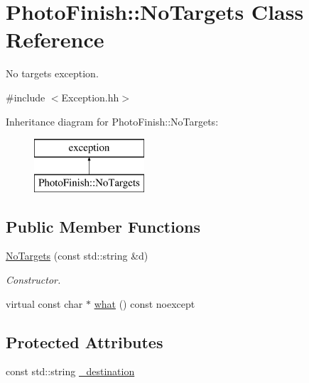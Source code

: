 \hypertarget{class_photo_finish_1_1_no_targets}{}\section{Photo\+Finish\+:\+:No\+Targets Class Reference}
\label{class_photo_finish_1_1_no_targets}


No targets exception.  




{\ttfamily \#include $<$Exception.\+hh$>$}

Inheritance diagram for Photo\+Finish\+:\+:No\+Targets\+:\begin{figure}[H]
\begin{center}
\leavevmode
\includegraphics[height=2.000000cm]{class_photo_finish_1_1_no_targets}
\end{center}
\end{figure}
\subsection*{Public Member Functions}
\begin{DoxyCompactItemize}
\item 
\hyperlink{class_photo_finish_1_1_no_targets_ab8e2b13061522bfa468d8df4dec41bf5}{No\+Targets} (const std\+::string \&d)
\begin{DoxyCompactList}\small\item\em Constructor. \end{DoxyCompactList}\item 
virtual const char $\ast$ \hyperlink{class_photo_finish_1_1_no_targets_a088b29651f950749ed274585c8d59956}{what} () const noexcept
\end{DoxyCompactItemize}
\subsection*{Protected Attributes}
\begin{DoxyCompactItemize}
\item 
const std\+::string \hyperlink{class_photo_finish_1_1_no_targets_a8320b51faa0efc71832f49ed13958ce7}{\+\_\+destination}
\end{DoxyCompactItemize}



